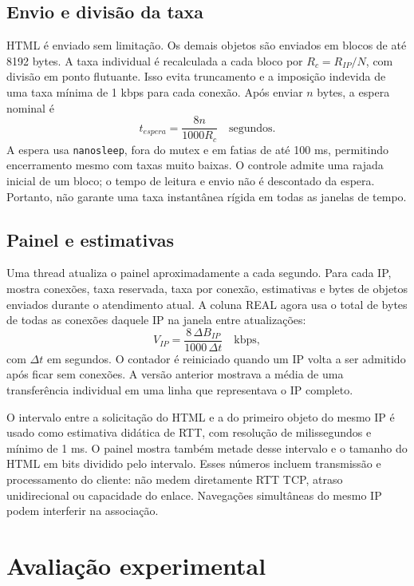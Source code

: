 \documentclass[12pt]{article}
\begin{document}
\subsection{Envio e divisão da taxa}
HTML é enviado sem limitação. Os demais objetos são enviados em blocos de até
8192 bytes. A taxa individual é recalculada a cada bloco por
$R_c=R_{IP}/N$, com divisão em ponto flutuante. Isso evita truncamento e a
imposição indevida de uma taxa mínima de 1 kbps para cada conexão.
Após enviar $n$ bytes, a espera nominal é
\begin{equation}
t_{espera}=\frac{8n}{1000R_c}\quad\text{segundos}.
\end{equation}
A espera usa \texttt{nanosleep}, fora do mutex e em fatias de até 100 ms,
permitindo encerramento mesmo com taxas muito baixas. O controle admite uma
rajada inicial de um bloco; o tempo de leitura e envio não é descontado da espera.
Portanto, não garante uma taxa instantânea rígida em todas as janelas de tempo.

\subsection{Painel e estimativas}
Uma thread atualiza o painel aproximadamente a cada segundo. Para cada IP,
mostra conexões, taxa reservada, taxa por conexão, estimativas e bytes de objetos
enviados durante o atendimento atual. A coluna REAL agora usa o total de bytes
de todas as conexões daquele IP na janela entre atualizações:
\begin{equation}
V_{IP}=\frac{8\,\Delta B_{IP}}{1000\,\Delta t}\quad\text{kbps},
\end{equation}
com $\Delta t$ em segundos. O contador é reiniciado quando um IP volta a ser
admitido após ficar sem conexões. A versão anterior mostrava a média de uma
transferência individual em uma linha que representava o IP completo.

O intervalo entre a solicitação do HTML e a do primeiro objeto do mesmo IP é
usado como estimativa didática de RTT, com resolução de milissegundos e mínimo
de 1 ms. O painel mostra também metade desse intervalo e o tamanho do HTML em
bits dividido pelo intervalo. Esses números incluem transmissão e processamento
do cliente: não medem diretamente RTT TCP, atraso unidirecional ou capacidade
do enlace. Navegações simultâneas do mesmo IP podem interferir na associação.

\section{Avaliação experimental}
\end{document}
